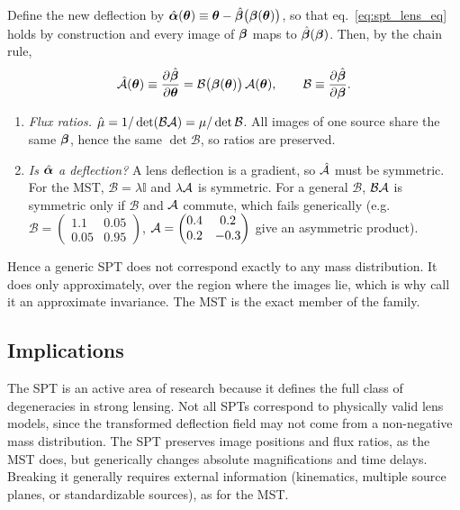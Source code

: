 \begin{derivation}
Define the new deflection by
$\hat{\boldsymbol{\alpha}}(\boldsymbol{\theta}) \equiv \boldsymbol{\theta} - \hat{\boldsymbol{\beta}}\big(\boldsymbol{\beta}(\boldsymbol{\theta})\big)$,
so that eq.~\eqref{eq:spt_lens_eq} holds by construction and every image of
$\boldsymbol{\beta}$ maps to $\hat{\boldsymbol{\beta}}(\boldsymbol{\beta})$.  Then, by the chain rule,
\[
  \hat{\mathcal{A}}(\boldsymbol{\theta}) \equiv \frac{\partial\hat{\boldsymbol{\beta}}}{\partial\boldsymbol{\theta}}
  = \mathcal{B}\big(\boldsymbol{\beta}(\boldsymbol{\theta})\big)\,\mathcal{A}(\boldsymbol{\theta}),
  \qquad \mathcal{B} \equiv \frac{\partial\hat{\boldsymbol{\beta}}}{\partial\boldsymbol{\beta}}.
\]
\begin{enumerate}[nosep]
  \item \textit{Flux ratios.}  $\hat\mu = 1/\det(\mathcal{B}\mathcal{A}) =
        \mu/\det\mathcal{B}$.  All images of one source share the same
        $\boldsymbol{\beta}$, hence the same $\det\mathcal{B}$, so ratios are preserved.
  \item \textit{Is $\hat{\boldsymbol{\alpha}}$ a deflection?}  A lens deflection is a
        gradient, so $\hat{\mathcal{A}}$ must be symmetric.  For the MST,
        $\mathcal{B} = \lambda\mathbb{I}$ and $\lambda\mathcal{A}$ is symmetric.  For
        a general $\mathcal{B}$, $\mathcal{B}\mathcal{A}$ is symmetric only if
        $\mathcal{B}$ and $\mathcal{A}$ commute, which fails generically (e.g.\
        $\mathcal{B} = \begin{pmatrix}1.1&0.05\\0.05&0.95\end{pmatrix}$,
        $\mathcal{A} = \begin{pmatrix}0.4&0.2\\0.2&-0.3\end{pmatrix}$ give an
        asymmetric product).
\end{enumerate}
Hence a generic SPT does not correspond exactly to any mass distribution.
It does only approximately, over the region where the images lie, which is
why \citet{schneider_sluse_2014} call it an approximate invariance.  The MST
is the exact member of the family.
\end{derivation}


\subsection{Implications}

The SPT is an active area of research because it defines the
full class of degeneracies in strong lensing.  Not all SPTs
correspond to physically valid lens models, since the transformed
deflection field may not come from a non-negative mass
distribution.  The SPT preserves image positions and flux ratios, as
the MST does, but generically changes absolute magnifications and
time delays.  Breaking it generally requires external information
(kinematics, multiple source planes, or standardizable sources), as
for the MST.

